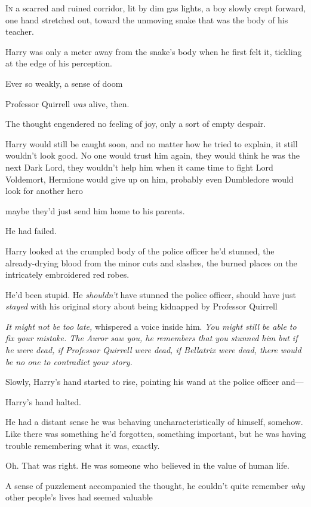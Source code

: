 
\lettrine{I}{n} a scarred and
ruined corridor, lit by dim gas lights, a boy slowly crept forward, one hand
stretched out, toward the unmoving snake that was the body of his teacher.

Harry was only a meter away from the snake's body when he first felt it,
tickling at the edge of his perception.

Ever so weakly, a sense of doom{\el}

Professor Quirrell \emph{was} alive, then.

The thought engendered no feeling of joy, only a sort of empty despair.

Harry would still be caught soon, and no matter how he tried to explain, it
still wouldn't look good. No one would trust him again, they would think he was
the next Dark Lord, they wouldn't help him when it came time to fight Lord
Voldemort, Hermione would give up on him, probably even Dumbledore would look
for another hero{\el}

{\el} maybe they'd just send him home to his parents.

He had failed.

Harry looked at the crumpled body of the police officer he'd stunned, the
already-drying blood from the minor cuts and slashes, the burned places on the
intricately embroidered red robes.

He'd been stupid. He \emph{shouldn't} have stunned the police officer, should
have just \emph{stayed} with his original story about being kidnapped by
Professor Quirrell{\el}

\emph{It might not be too late,} whispered a voice inside him. \emph{You might
still be able to fix your mistake. The Auror saw you, he remembers that you
stunned him{\el} but if he were dead, if Professor Quirrell were dead, if
Bellatrix were dead, there would be no one to contradict your story.}

Slowly, Harry's hand started to rise, pointing his wand at the police officer
and---

Harry's hand halted.

He had a distant sense he was behaving uncharacteristically of himself,
somehow. Like there was something he'd forgotten, something important, but he
was having trouble remembering what it was, exactly.

Oh. That was right. He was someone who believed in the value of human life.

A sense of puzzlement accompanied the thought, he couldn't quite remember
\emph{why} other people's lives had seemed valuable{\el}

